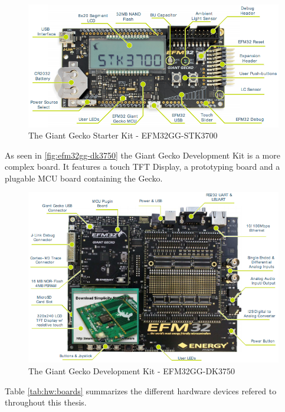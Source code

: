 \begin{figure}[H]
  \begin{center}
    \includegraphics[scale=0.4]{figures/efm32gg-stk3700}
  \end{center}
  \caption{The Giant Gecko Starter Kit - EFM32GG-STK3700 \cite{UM-STK} }
  \label{fig:efm32gg-stk3700}
\end{figure}

As seen in \autoref{fig:efm32gg-dk3750} the Giant Gecko Development Kit is a more complex board.
It features a touch TFT Display, a prototyping board and a plugable MCU board containing the Gecko.

\begin{figure}[H]
  \begin{center}
    \includegraphics[scale=0.5]{figures/efm32gg-dk3750}
  \end{center}
  \caption{The Giant Gecko Development Kit - EFM32GG-DK3750 \cite{UM-DK}}
  \label{fig:efm32gg-dk3750}
\end{figure}

Table \ref{tab:hw:boards} summarizes the different hardware devices refered to throughout this thesis.

